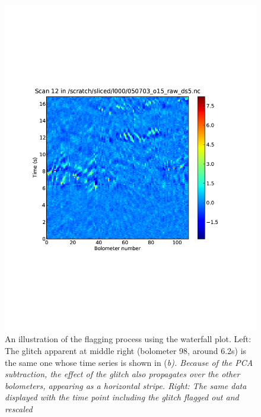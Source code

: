 \documentclass[12pt,preprint]{aastex}
\begin{document}
\begin{figure}
\begin{minipage}{3.25in}
\begin{center}
      \includegraphics[scale=0.5]{flagger_glitchgone}
    \end{center}
  \end{minipage}
  \caption{An illustration of the flagging process using the waterfall plot.
  Left: The glitch apparent at middle right (bolometer 98, around 6.2s) is the
  same one whose time series is shown in (\em{b}).  Because of
  the PCA subtraction, the effect of the glitch also propagates over the other
  bolometers, appearing as a horizontal stripe. Right: The same data displayed
  with the time point including the glitch flagged out and rescaled}

  \label{fig:Flagger}

  \addtocounter{figure}{0} 
  \addtocounter{subfig}{1}
  

\end{figure}
\end{document}
